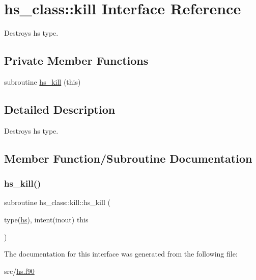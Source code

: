 \hypertarget{interfacehs__class_1_1kill}{}\section{hs\+\_\+class\+:\+:kill Interface Reference}
\label{interfacehs__class_1_1kill}


Destroys hs type.  


\subsection*{Private Member Functions}
\begin{DoxyCompactItemize}
\item 
subroutine \hyperlink{interfacehs__class_1_1kill_a812cb796d6ac4cec1ff71e473bef5cca}{hs\+\_\+kill} (this)
\end{DoxyCompactItemize}


\subsection{Detailed Description}
Destroys hs type. 

\subsection{Member Function/\+Subroutine Documentation}
\mbox{\label{interfacehs__class_1_1kill_a812cb796d6ac4cec1ff71e473bef5cca}} 
\subsubsection{\texorpdfstring{hs\+\_\+kill()}{hs\_kill()}}
{\footnotesize\ttfamily subroutine hs\+\_\+class\+::kill\+::hs\+\_\+kill (\begin{DoxyParamCaption}\item[{type(\hyperlink{strucths__class_1_1hs}{hs}), intent(inout)}]{this }\end{DoxyParamCaption})\hspace{0.3cm}{\ttfamily [private]}}



The documentation for this interface was generated from the following file\+:\begin{DoxyCompactItemize}
\item 
src/\hyperlink{hs_8f90}{hs.\+f90}\end{DoxyCompactItemize}

